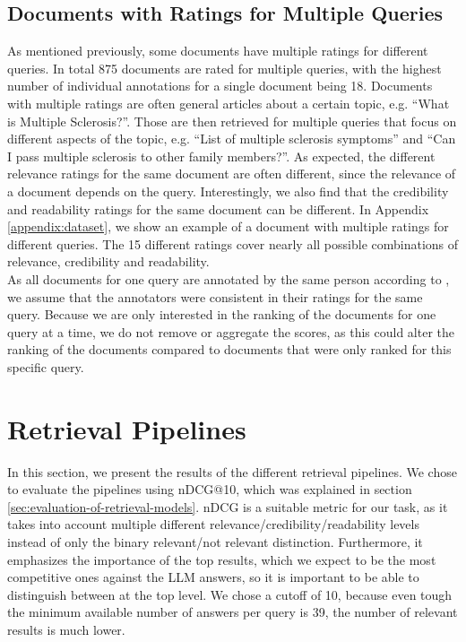 \subsection{Documents with Ratings for Multiple Queries}
As mentioned previously, some documents have multiple ratings for different queries.
In total 875 documents are rated for multiple queries, with the highest number of individual annotations for a single document being 18.
Documents with multiple ratings are often general articles about a certain topic, e.g. ``What is Multiple Sclerosis?''.
Those are then retrieved for multiple queries that focus on different aspects of the topic, e.g. ``List of multiple sclerosis symptoms'' and ``Can I pass multiple sclerosis to other family members?''.
As expected, the different relevance ratings for the same document are often different, since the relevance of a document depends on the query.
Interestingly, we also find that the credibility and readability ratings for the same document can be different.
In Appendix \ref{appendix:dataset}, we show an example of a document with multiple ratings for different queries.
The 15 different ratings cover nearly all possible combinations of relevance, credibility and readability.
\\
As all documents for one query are annotated by the same person according to \cite{goeuriot:2021}, we assume that the annotators were consistent in their ratings for the same query.
Because we are only interested in the ranking of the documents for one query at a time, we do not remove or aggregate the scores, as this could alter the ranking of the documents compared to documents that were only ranked for this specific query.

\section{Retrieval Pipelines}
In this section, we present the results of the different retrieval pipelines.
We chose to evaluate the pipelines using nDCG@10, which was explained in section \ref{sec:evaluation-of-retrieval-models}.
nDCG is a suitable metric for our task, as it takes into account multiple different relevance/credibility/readability levels instead of only the binary relevant/not relevant distinction.
Furthermore, it emphasizes the importance of the top results, which we expect to be the most competitive ones against the LLM answers, so it is important to be able to distinguish between at the top level.
We chose a cutoff of 10, because even tough the minimum available number of answers per query is 39, the number of relevant results is much lower.
\\
